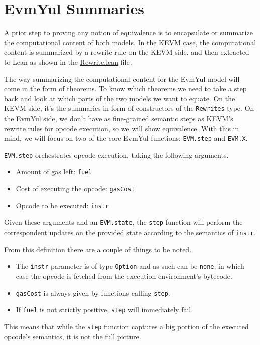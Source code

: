 \chapter{EvmYul Summaries}

A prior step to proving any notion of equivalence is to encapsulate or summarize
the computational content of both models. In the KEVM case, the computational
content is summarized by a rewrite rule on the KEVM side, and then extracted to
Lean as shown in the
\href{https://runtimeverification.github.io/evm-equivalence/docs/EvmEquivalence/KEVM2Lean/Rewrite.html}{Rewrite.lean}
file.

The way summarizing the computational content for the EvmYul model will come in
the form of theorems. To know which theorems we need to take a step back and
look at which parts of the two models we want to equate. On the KEVM side, it's
the summaries in form of constructors of the \texttt{Rewrites} type.
On the EvmYul side, we don't have as fine-grained semantic steps as KEVM's
rewrite rules for opcode execution, so we will show equivalence. With this in
mind, we will focus on two of the core EvmYul functions: \texttt{EVM.step} and
\texttt{EVM.X}.

\begin{definition}
\label{def:EVM.step}\leanok
\texttt{EVM.step} orchestrates opcode execution, taking the following arguments.
\begin{itemize}
\item Amount of gas left: \texttt{fuel}
\item Cost of executing the opcode: \texttt{gasCost}
\item Opcode to be executed: \texttt{instr}
\end{itemize}

Given these arguments and an \texttt{EVM.state}, the \texttt{step} function will
perform the correspondent updates on the provided state according to the
semantics of \texttt{instr}.
\end{definition}

From this definition there are a couple of things to be noted.
\begin{itemize}
\item The \texttt{instr} parameter is of type \texttt{Option} and as such
can be \texttt{none}, in which case the opcode is fetched from the execution
environment's bytecode.
\item \texttt{gasCost} is always given by functions calling \texttt{step}.
\item If \texttt{fuel} is not strictly positive, \texttt{step} will immediately fail.
\end{itemize}
This means that while the \texttt{step} function captures a big portion of the
executed opcode's semantics, it is not the full picture.

